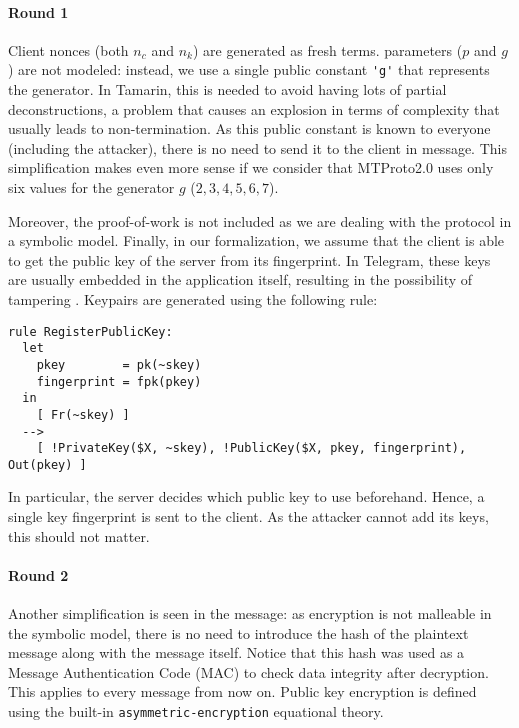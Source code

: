 \lstset{language=tamarin}

\paragraph{Round 1}
Client nonces (both $n_c$ and $n_k$) are generated as fresh terms.
\DiHe{} parameters ($p$ and $g$) are not modeled: instead, we use a single public constant \lstinline{'g'} that represents the generator. In Tamarin, this is needed to avoid having lots of partial deconstructions, a problem that causes an explosion in terms of complexity that usually leads to non-termination. As this public constant is known to everyone (including the attacker), there is no need to send it to the client in  message. This simplification makes even more sense if we consider that MTProto2.0 uses only six values for the generator $g$ ($2, 3, 4, 5, 6, 7$).

Moreover, the proof-of-work is not included as we are dealing with the protocol in a symbolic model. Finally, in our formalization, we assume that the client is able to get the public key of the server from its fingerprint. In Telegram, these keys are usually embedded in the application itself, resulting in the possibility of tampering \cite{MTProto2-Proverif}. Keypairs are generated using the following rule:

\begin{lstlisting}
rule RegisterPublicKey:
  let
    pkey        = pk(~skey)
    fingerprint = fpk(pkey)
  in
    [ Fr(~skey) ]
  -->
    [ !PrivateKey($X, ~skey), !PublicKey($X, pkey, fingerprint), Out(pkey) ]
\end{lstlisting}

In particular, the server decides which public key to use beforehand. Hence, a single key fingerprint is sent to the client. As the attacker cannot add its keys, this should not matter.

\paragraph{Round 2} Another simplification is seen in the  message: as encryption is not malleable in the symbolic model, there is no need to introduce the hash of the plaintext message along with the message itself. Notice that this hash was used as a Message Authentication Code (MAC) to check data integrity after decryption. This applies to every message from now on. Public key encryption is defined using the built-in \lstinline{asymmetric-encryption} equational theory.

